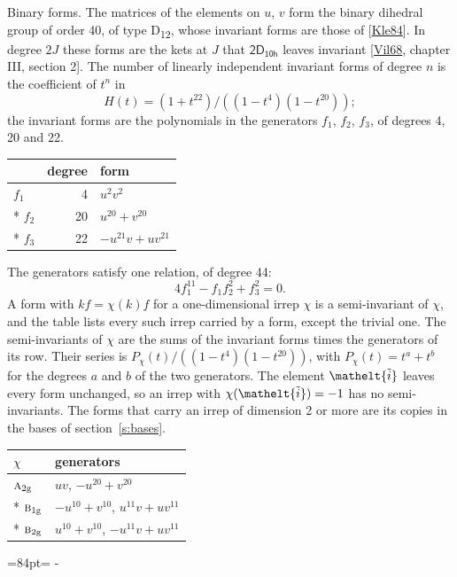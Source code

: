 \documentclass[10pt,a4paper]{article}
\makeatletter
\renewcommand\paragraph{\@startsection{paragraph}{4}{\z@}{1.5ex plus .5ex minus .2ex}{-1em}%
  {\normalfont\small\sffamily\bfseries\color{parttitle}}}
\newcommand{\needspace}[1]{\par\penalty-100\begingroup\dimen0=#1\relax\dimen2=\pagegoal
  \advance\dimen2-\pagetotal\ifdim\dimen0>\dimen2\relax\ifdim\dimen2>0pt\vfil\break\fi\fi
  \endgroup}
\numberwithin{equation}{section}
\newcommand{\eltfont}[1]{{\let\sigma\eltsigma\mathelt{#1}}}
\newcommand{\grp}[1]{\mathsf{#1}}
\newcommand{\irr}[1]{\text{\normalfont\scshape #1}}
\newcommand{\elt}[1]{\eltfont{#1}}
\newcommand{\ptag}[1]{\mathrm{#1}}
\newcommand{\lift}[1]{\tilde{#1}}
\makeatother
\begin{document}
\paragraph{Binary forms.}
The matrices of the elements on $u$, $v$ form the binary dihedral group of order 40, of type D\textsubscript{12}, whose invariant forms are those of [\href{../../../REFERENCES.pdf\#ref.Kle84}{Kle84}]. In degree $2J$ these forms are the kets at $J$ that $\grp{2D_{10h}}$ leaves invariant [\href{../../../REFERENCES.pdf\#ref.Vil68}{Vil68}, chapter III, section 2]. \label{n:head.degree}\label{n:head.form}The number of linearly independent invariant forms of degree $n$ is the coefficient of $t^n$ in
\begin{equation}\label{e:molien}H(t) = (1 + t^{22})/((1-t^{4})(1-t^{20}));\end{equation}
the invariant forms are the polynomials in the generators $f_1$, $f_2$, $f_3$, of degrees 4, 20 and 22.
{\small\begin{longtable}{@{}lrl@{}}\toprule
& degree & form\\\midrule\endhead
\bottomrule\endfoot\endlastfoot
$f_{1}$ & 4 & $u^{2}v^{2}$\\*
$f_{2}$ & 20 & $u^{20} + v^{20}$\\*
$f_{3}$ & 22 & $-u^{21}v + uv^{21}$\\
\bottomrule\end{longtable}}
The generators satisfy one relation, of degree 44:
\begin{equation}\label{e:relation}4f_{1}^{11} - f_{1}f_{2}^{2} + f_{3}^{2} = 0.\end{equation}
A form with $k f = \chi(k) f$ for a one-dimensional irrep $\chi$ is a semi-invariant of $\chi$, and the table lists every such irrep carried by a form, except the trivial one. \label{n:head.generators}The semi-invariants of $\chi$ are the sums of the invariant forms times the generators of its row. Their series is $P_\chi(t)/((1-t^{4})(1-t^{20}))$, with $P_\chi(t) = t^{a} + t^{b}$ for the degrees $a$ and $b$ of the two generators. The element $\elt{\lift{i}}$ leaves every form unchanged, so an irrep with $\chi(\elt{\lift{i}}) = -1$ has no semi-invariants. The forms that carry an irrep of dimension 2 or more are its copies in the bases of section~\ref{s:bases}.
{\small\begin{longtable}{@{}ll@{}}\toprule
$\chi$ & generators\\\midrule\endhead
\bottomrule\endfoot\endlastfoot
$\irr{a}_{2\ptag{g}}$ & $uv$, $-u^{20} + v^{20}$\\*
$\irr{b}_{1\ptag{g}}$ & $-u^{10} + v^{10}$, $u^{11}v + uv^{11}$\\*
$\irr{b}_{2\ptag{g}}$ & $u^{10} + v^{10}$, $-u^{11}v + uv^{11}$\\
\bottomrule\end{longtable}}
\needspace{84pt}
\end{document}
